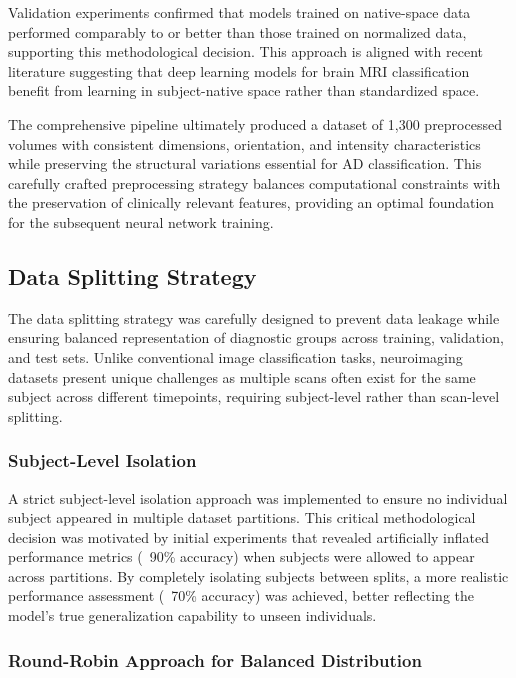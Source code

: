 \documentclass[12pt, a4paper]{article}
\begin{document}
Validation experiments confirmed that models trained on native-space data performed comparably to or better than those trained on normalized data, supporting this methodological decision. This approach is aligned with recent literature suggesting that deep learning models for brain MRI classification benefit from learning in subject-native space rather than standardized space.

The comprehensive pipeline ultimately produced a dataset of 1,300 preprocessed volumes with consistent dimensions, orientation, and intensity characteristics while preserving the structural variations essential for AD classification. This carefully crafted preprocessing strategy balances computational constraints with the preservation of clinically relevant features, providing an optimal foundation for the subsequent neural network training.

\subsection{Data Splitting Strategy}

The data splitting strategy was carefully designed to prevent data leakage while ensuring balanced representation of diagnostic groups across training, validation, and test sets. Unlike conventional image classification tasks, neuroimaging datasets present unique challenges as multiple scans often exist for the same subject across different timepoints, requiring subject-level rather than scan-level splitting.

\subsubsection{Subject-Level Isolation}

A strict subject-level isolation approach was implemented to ensure no individual subject appeared in multiple dataset partitions. This critical methodological decision was motivated by initial experiments that revealed artificially inflated performance metrics (~90\% accuracy) when subjects were allowed to appear across partitions. By completely isolating subjects between splits, a more realistic performance assessment (~70\% accuracy) was achieved, better reflecting the model's true generalization capability to unseen individuals.

\subsubsection{Round-Robin Approach for Balanced Distribution}
\end{document}
